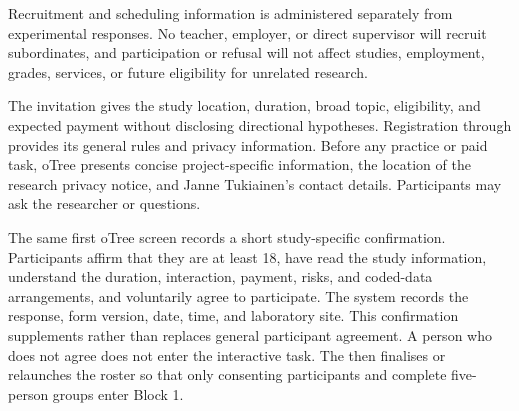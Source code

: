 Recruitment and scheduling information is administered separately from experimental responses.  No teacher, employer, or direct supervisor will recruit subordinates, and participation or refusal will not affect studies, employment, grades, services, or future eligibility for unrelated research.

The invitation gives the study location, duration, broad topic, eligibility, and expected payment without disclosing directional hypotheses. Registration through  provides its general rules and privacy information. Before any practice or paid task, oTree presents concise project-specific information, the location of the research privacy notice, and Janne Tukiainen's contact details.  Participants may ask the researcher or  questions.

The same first oTree screen records a short study-specific confirmation. Participants affirm that they are at least 18, have read the study information, understand the duration, interaction, payment, risks,  and coded-data arrangements, and voluntarily agree to participate. The system records the response, form version, date, time, and laboratory site. This confirmation supplements rather than replaces  general participant agreement. A person who does not agree does not enter the interactive task. The  then finalises or relaunches the roster so that only consenting participants and complete five-person groups enter Block 1.

